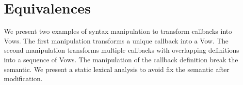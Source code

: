 

\section{Equivalences} \label{section:equivalences}

We present two examples of syntax manipulation to transform callbacks into Vows.
The first manipulation transforms a unique callback into a Vow.
The second manipulation transforms multiple callbacks with overlapping definitions into a sequence of Vows.
The manipulation of the callback definition break the semantic.
We present a static lexical analysis to avoid fix the semantic after modification.

